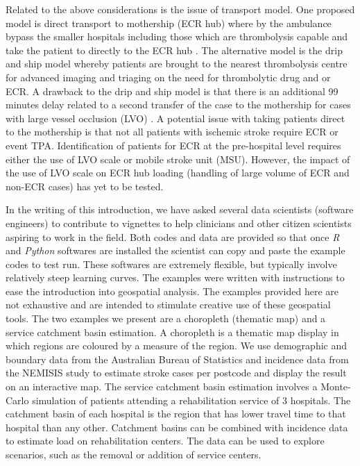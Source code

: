 \documentclass[utf8]{frontiersHLTH}
\begin{document}
Related to the above considerations is the issue of transport
model. One proposed model is direct transport to mothership (ECR hub)
where by the ambulance bypass the smaller hospitals including those
which are thrombolysis capable and take the patient to directly to the
ECR hub \cite{Milne_2017, 10.1001/jamaneurol.2018.2424}. The
alternative model is the drip and ship model whereby patients are
brought to the nearest thrombolysis centre for advanced imaging and
triaging on the need for thrombolytic drug and or ECR. A drawback to
the drip and ship model is that there is an additional 99 minutes
delay related to a second transfer of the case to the mothership for
cases with large vessel occlusion (LVO)
\cite{froehler2017interhospital}. A potential issue with taking
patients direct to the mothership is that not all patients with
ischemic stroke require ECR or event TPA. Identification of patients
for ECR at the pre-hospital level requires either the use of LVO scale
or mobile stroke unit (MSU). However, the impact of the use of LVO
scale on ECR hub loading (handling of large volume of ECR and non-ECR
cases) has yet to be tested.

In the writing of this introduction, we have asked several data
scientists (software engineers) to contribute to vignettes to help
clinicians and other citizen scientists aspiring to work in the
field. Both codes and data are provided so that once {\em R} and {\em
  Python} softwares are installed the scientist can copy and paste the
example codes to test run. These softwares are extremely flexible, but
typically involve relatively steep learning curves. The examples were
written with instructions to ease the introduction into geospatial
analysis. The examples provided here are not exhaustive and are
intended to stimulate creative use of these geospatial tools. The two
examples we present are a choropleth (thematic map) and a service
catchment basin estimation. A choropleth is a thematic map display in
which regions are coloured by a measure of the region. We use
demographic and boundary data from the Australian Bureau of Statistics
and incidence data from the NEMISIS
\cite{thrift_stroke_2000,azarpazhooh2008patterns} study to estimate
stroke cases per postcode and display the result on an interactive
map. The service catchment basin estimation involves a Monte-Carlo
simulation of patients attending a rehabilitation service of 3
hospitals. The catchment basin of each hospital is the region that has
lower travel time to that hospital than any other. Catchment basins
can be combined with incidence data to estimate load on rehabilitation
centers. The data can be used to explore scenarios, such as the
removal or addition of service centers.
\end{document}
